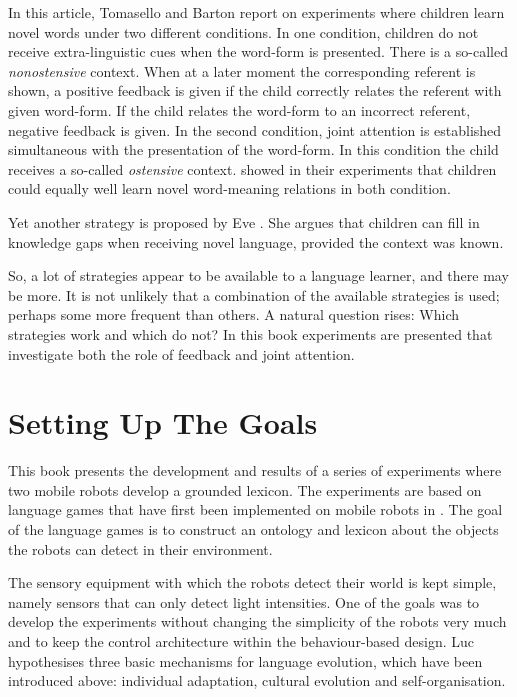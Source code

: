 In this article, Tomasello and Barton report on experiments where children learn novel words under two different conditions. In one condition, children do not receive extra-linguistic cues when the word-form is presented. There is a so-called {\em nonostensive} context. When at a later moment the corresponding referent is shown, a positive feedback is given if the child correctly relates the referent with given word-form. If the child relates the word-form to an incorrect referent, negative feedback is given. In the second condition, joint attention is established simultaneous with the presentation of the word-form. In this condition the child receives a so-called {\em ostensive} context. \citet{tomasellobarton:1994} showed in their experiments that children could equally well learn novel word-meaning relations in both condition.

Yet another strategy is proposed by Eve \citet{clark:1993}. She argues that children can fill in knowledge gaps when receiving novel language, provided the context was known. 


So, a lot of strategies appear to be available to a language learner, and there may be more. It is not unlikely that a combination of the available strategies is used; perhaps some more frequent than others. A natural question rises: Which strategies work and which do not? In this book experiments are presented that investigate both the role of feedback and joint attention.


\section{Setting Up The Goals}\label{s:intro:goals}

This book presents the development and results of a series of experiments where two mobile robots develop a grounded lexicon. The experiments are based on language games that have first been implemented on mobile robots in \citep{steelsvogt:1997,vogt:1997}. The goal of the language games is to construct an ontology and lexicon about the objects the robots can detect in their environment.



The sensory equipment with which the robots detect their world is kept simple, namely sensors that can only detect light intensities. One of the goals was to develop the experiments without changing the simplicity of the robots very much and to keep the control architecture within the behaviour-based design. Luc \citet{steels:1996a} hypothesises three basic mechanisms for language evolution, which have been introduced above: individual adaptation, cultural evolution and self-organisation. 


